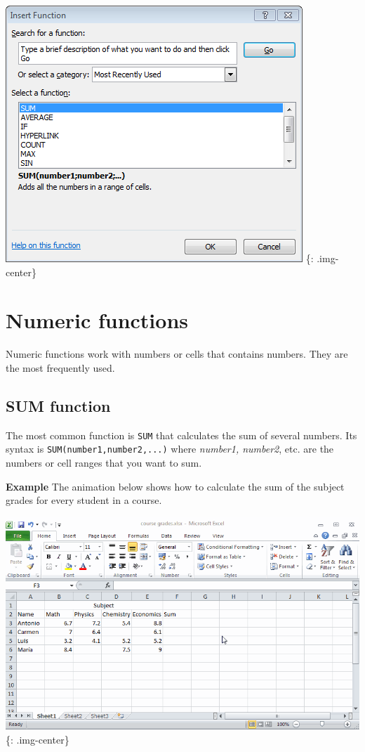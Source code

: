 \includegraphics[keepaspectratio,width=\textwidth,height=0.75\textheight]{img/dialog_insert_function.png}
\{: .img-center\}

\chapter{Numeric functions}
\label{numericfunctions}

Numeric functions work with numbers or cells that contains numbers. They are the most frequently used. 

\section{SUM function}
\label{sumfunction}

The most common function is \texttt{SUM} that calculates the sum of several numbers. Its syntax is \texttt{SUM(number1,number2,...)} where \emph{number1, number2}, etc. are the numbers or cell ranges that you want to sum. 

\textbf{Example} The animation below shows how to calculate the sum of the subject grades for every student in a course. 

\includegraphics[keepaspectratio,width=\textwidth,height=0.75\textheight]{img/example_function_sum.gif}
\{: .img-center\}

